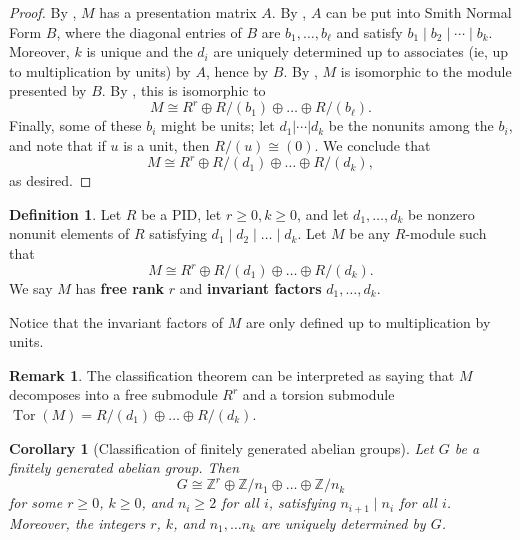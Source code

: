 \documentclass[12pt]{report}
\newtheorem{corollary}[theorem]{Corollary}
\numberwithin{equation}{section}
\numberwithin{theorem}{chapter}
\theoremstyle{definition}
\newtheorem{definition}[theorem]{Definition}
\newtheorem*{basic properties}{Basic Properties}
\newtheorem*{Important Remark}{Important Remark}
\newtheorem{remark}[theorem]{Remark}
\newcommand{\df}[1]{{\bf #1}\index{#1}}
\newcommand{\Z}{\mathbb{Z}}
\DeclareMathOperator{\Tor}{Tor}
\begin{document}
\begin{proof}
By , $M$ has a presentation matrix $A$. By , $A$ can be put into Smith Normal Form $B$, where the diagonal entries of $B$ are $b_1, \ldots, b_\ell$ and satisfy $b_1 \mid b_2 \mid \cdots \mid b_k$. Moreover, $k$ is unique and the $d_i$ are uniquely determined up to associates (ie, up to multiplication by units) by $A$, hence by $B$. By , $M$ is isomorphic to the module presented by $B$. 
By , this is isomorphic to 
$$M \cong R^r \oplus R/(b_1) \oplus \dots \oplus R/(b_\ell).$$
Finally, some of these $b_i$ might be units; let $d_1 | \cdots | d_k$ be the nonunits among the $b_i$, and note that if $u$ is a unit, then $R/(u) \cong (0)$. We conclude that
$$M \cong R^r \oplus R/(d_1) \oplus \dots \oplus R/(d_k),$$
as desired.
\end{proof}

\begin{definition} 
Let $R$ be a PID, let $r \geqslant 0, k \geqslant 0$, and let $d_1,\ldots, d_k$ be nonzero nonunit elements of $R$ satisfying $d_1 \mid d_2 \mid \dots \mid d_k$. Let $M$ be any $R$-module such that 
$$M \cong R^r \oplus R/(d_1) \oplus \dots \oplus R/(d_k).$$ 
We say $M$ has \df{free rank} $r$ and \df{invariant factors} $d_1,\ldots,d_k$.
\end{definition}

Notice that the invariant factors of $M$ are only defined up to multiplication by units.

\begin{remark}
The classification theorem can be interpreted as saying that $M$ decomposes into a free submodule $R^r$ and a torsion submodule $\Tor(M)=R/(d_1) \oplus \dots \oplus R/(d_k)$.
\end{remark}



\begin{corollary}[Classification of finitely generated abelian groups]%
Let $G$ be a finitely generated abelian group. Then 
$$G \cong \Z^r \oplus \Z/n_1 \oplus \dots \oplus \Z/n_k$$ 
for some $r \geqslant 0$, $k \geqslant 0$, and $n_i \geqslant 2$ for all $i$, satisfying $n_{i+1} \mid n_i$ for all $i$. Moreover, the integers $r$, $k$, and $n_1,\ldots n_k$ are uniquely determined by $G$.
\end{corollary}
\end{document}
